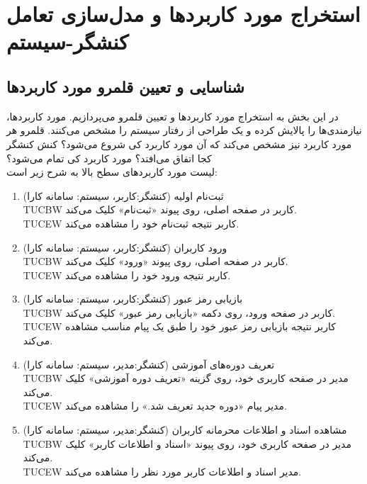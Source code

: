 \documentclass[12pt]{article}
\begin{document}
	\newpage
	\section{استخراج مورد کاربردها و مدل‌سازی تعامل کنشگر-سیستم}
	\subsection{شناسایی و تعیین قلمرو مورد کاربردها}
	در این بخش به استخراج مورد کاربردها و تعیین قلمرو می‌پردازیم. مورد کاربردها، نیازمندی‌ها را پالایش کرده و یک طراحی از رفتار سیستم را مشخص می‌کنند. قلمرو هر مورد کاربرد نیز مشخص می‌کند که آن مورد کاربرد کی شروع می‌شود؟ کنش کنشگر کجا اتفاق می‌افتد؟ مورد کاربرد کی تمام می‌شود؟\\
	لیست مورد کاربردهای سطح بالا به شرح زیر است:
	\begin{enumerate}
		\item
		ثبت‌نام اولیه (کنشگر:‌کاربر، سیستم: سامانه کارا)\\
		TUCBW کاربر در صفحه اصلی، روی پیوند «ثبت‌نام» کلیک می‌کند.\\
		TUCEW کاربر نتیجه ثبت‌نام خود را مشاهده می‌کند.\\

		\item
		ورود کاربران (کنشگر:‌کاربر، سیستم: سامانه کارا)\\
		TUCBW کاربر در صفحه اصلی، روی پیوند «ورود» کلیک می‌کند. \\
		TUCEW کاربر نتیجه ورود خود را مشاهده می‌کند.\\

		\item
		بازیابی رمز عبور (کنشگر:‌کاربر، سیستم: سامانه کارا)\\
		TUCBW کاربر در صفحه ورود، روی دکمه «بازیابی رمز عبور» کلیک می‌کند.\\
		TUCEW کاربر نتیجه بازیابی رمز عبور خود را طبق یک پیام مناسب مشاهده می‌کند.\\

		\item
		تعریف دوره‌های آموزشی (کنشگر:‌مدیر، سیستم: سامانه کارا)\\
		TUCBW  مدیر در صفحه کاربری خود، روی گزینه «تعریف دوره آموزشی» کلیک می‌کند.\\
		TUCEW مدیر پیام «دوره جدید تعریف شد.» را مشاهده می‌کند.\\

		\item
		مشاهده اسناد و اطلاعات محرمانه کاربران (کنشگر:‌مدیر، سیستم: سامانه کارا)\\
		TUCBW مدیر در صفحه کاربری خود، روی پیوند «اسناد و اطلاعات کاربر» کلیک می‌کند.\\
		TUCEW مدیر اسناد و اطلاعات کاربر مورد نظر را مشاهده می‌کند.\\


\end{enumerate}
\end{document}
